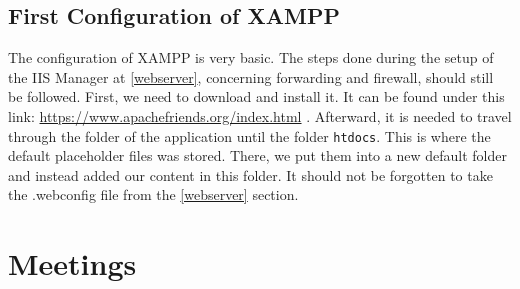 \documentclass{scrreprt}
\begin{document}
\section{First Configuration of XAMPP}
The configuration of XAMPP is very basic. The steps done during the setup of the IIS Manager at \ref{webserver}, concerning forwarding and firewall, should still be followed. First, we need to download and install it. It can be found under this link: \url{https://www.apachefriends.org/index.html} . Afterward, it is needed to travel through the folder of the application until the folder 
\texttt{htdocs}. This is where the default placeholder files was stored. There, we put them into a new default folder and instead added our content in this folder. It should not be forgotten to take the .webconfig file from the \ref{webserver} section.

\chapter{Meetings}
\end{document}
